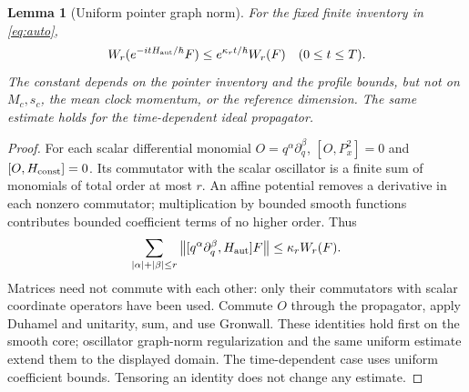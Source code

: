 \documentclass[11pt]{article}
\newtheorem{lemma}[theorem]{Lemma}
\theoremstyle{definition}\newtheorem{assumption}[theorem]{Constitutive assumption}
\theoremstyle{remark}\newtheorem{remark}[theorem]{Remark}
\newcommand{\norm}[1]{\left\|#1\right\|}\newcommand{\pos}[1]{[#1]_+}
\begin{document}
\begin{lemma}[Uniform pointer graph norm]\label{lem:graph}
For the fixed finite inventory in \eqref{eq:auto},
\begin{equation}\label{eq:graph}
 W_r(e^{-itH_{\rm aut}/\hbar}F)\le e^{\kappa_rt/\hbar}W_r(F)
 \quad(0\le t\le T).
\end{equation}
The constant depends on the pointer inventory and the profile bounds, but not on $M_c,s_c$, the mean clock momentum, or the reference dimension. The same estimate holds for the time-dependent ideal propagator.
\end{lemma}
\begin{proof}
For each scalar differential monomial $O=q^\alpha\partial_q^\beta$, $[O,P_x^2]=0$ and $[O,H_{\rm const}]=0$. Its commutator with the scalar oscillator is a finite sum of monomials of total order at most $r$. An affine potential removes a derivative in each nonzero commutator; multiplication by bounded smooth functions contributes bounded coefficient terms of no higher order. Thus
\[
 \sum_{|\alpha|+|\beta|\le r}\norm{[q^\alpha\partial_q^\beta,H_{\rm aut}]F}
 \le \kappa_rW_r(F).
\]
Matrices need not commute with each other: only their commutators with scalar coordinate operators have been used. Commute $O$ through the propagator, apply Duhamel and unitarity, sum, and use Gronwall. These identities hold first on the smooth core; oscillator graph-norm regularization and the same uniform estimate extend them to the displayed domain. The time-dependent case uses uniform coefficient bounds. Tensoring an identity does not change any estimate.
\end{proof}
\end{document}
